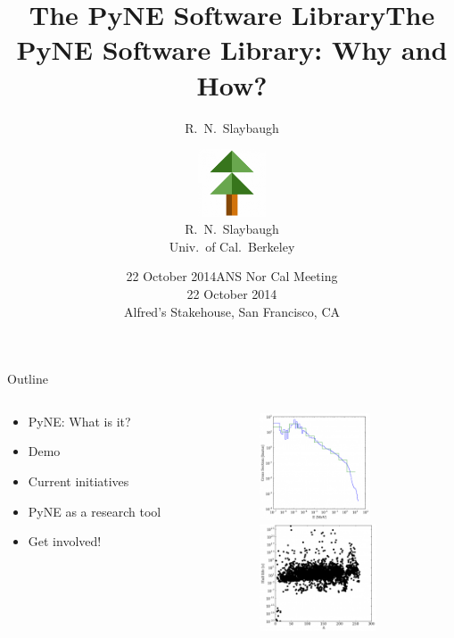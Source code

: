 \documentclass[xcolor=x11names,compress]{beamer}
\title{The PyNE Software Library}
\author{R.\ N.\ Slaybaugh}
\date{22 October 2014}
\renewcommand{\(}{\begin{columns}}
\renewcommand{\)}{\end{columns}}
\newcommand{\<}[1]{\begin{column}{#1}}
\renewcommand{\>}{\end{column}}
\begin{document}
\begin{frame}
\title{The PyNE Software Library: Why and How?}
\author{
        \includegraphics[height=2cm]{pyne-icon-big}\\R.\ N.\ Slaybaugh \\ Univ.\ of Cal.\ Berkeley}

\date{ANS Nor Cal Meeting \\ 22 October 2014\\ Alfred's Stakehouse, San Francisco, CA}
\titlepage
\end{frame}

\begin{frame}{Outline}

	\begin{columns}
  	\begin{column}{0.4\textwidth}
	    \begin{itemize}
        \item PyNE: What is it?
        \item Demo
        \item Current initiatives
        \item PyNE as a research tool
        \item Get involved!
	    \end{itemize}
  	\end{column}
 	\begin{column}{0.5\textwidth}
 	   \begin{center}
 	   \begin{figure}
 	   \includegraphics[height=1.25in,clip]{data_sources_thumb}  \\
       \includegraphics[height=1.25in,clip]{half_life_thumb}
 	   \end{figure}
 	   \end{center}
  	\end{column}
	\end{columns}

\end{frame}
\end{document}
